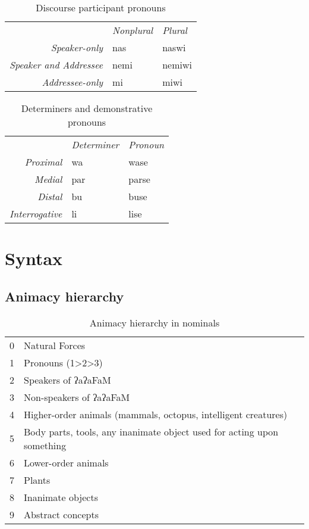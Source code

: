 \documentclass[a4paper,10pt,twoside,openright,draft]{memoir}
\newcommand{\lang}{ʔaʔaFaM}
\begin{document}
\begin{table}[ht]
    \centering
    \begin{tabular}{rll}
        & \textit{Nonplural} & \textit{Plural} \\
    \textit{Speaker-only} & nas & naswi \\
    \textit{Speaker and Addressee} & nemi & nemiwi \\
    \textit{Addressee-only} & mi & miwi \\
    \end{tabular}
    \caption{Discourse participant pronouns}
    \label{tab:firstandsecond}
\end{table}

\begin{table}[ht]
    \centering
    \begin{tabular}{>{\em}rll}
        & \textit{Determiner} & \textit{Pronoun}  \\
    Proximal & wa & wase \\
    Medial & par & parse \\
    Distal & bu & buse \\
    Interrogative & li & lise \\
    \end{tabular}
    \caption{Determiners and demonstrative pronouns}
    \label{tab:determiners}
\end{table}

\chapter{Syntax}

\section{Animacy hierarchy}

\begin{table}[ht]
    \centering
    \begin{tabular}{ll}
    0 & Natural Forces \\
    1 & Pronouns (1>2>3) \\
    2 & Speakers of \lang{} \\
    3 & Non-speakers of \lang{} \\
    4 & Higher-order animals (mammals, octopus, intelligent creatures) \\
    5 & \parbox[t]{7cm}{Body parts, tools, any inanimate object used for acting upon something} \\
    6 & Lower-order animals \\
    7 & Plants \\
    8 & Inanimate objects \\
    9 & Abstract concepts 
    \end{tabular}
    \caption{Animacy hierarchy in nominals}
    \label{tab:hierarchy}
\end{table}
\end{document}
